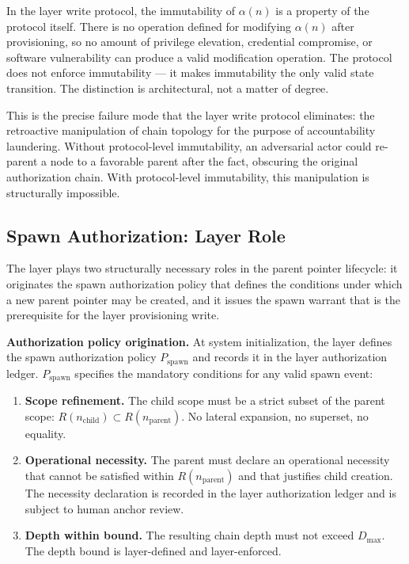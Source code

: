 In the \fact{} layer write protocol, the immutability of $\alpha(n)$ is a property of the protocol itself. There is no operation defined for modifying $\alpha(n)$ after provisioning, so no amount of privilege elevation, credential compromise, or software vulnerability can produce a valid modification operation. The protocol does not enforce immutability --- it makes immutability the only valid state transition. The distinction is architectural, not a matter of degree.

This is the precise failure mode that the \fact{} layer write protocol eliminates: the retroactive manipulation of chain topology for the purpose of accountability laundering. Without protocol-level immutability, an adversarial actor could re-parent a node to a favorable parent after the fact, obscuring the original authorization chain. With protocol-level immutability, this manipulation is structurally impossible.

\subsection{Spawn Authorization: \purpose{} Layer Role}
\label{sec:purpose-layer-spawn-authorization}

The \purpose{} layer plays two structurally necessary roles in the parent pointer lifecycle: it originates the spawn authorization policy that defines the conditions under which a new parent pointer may be created, and it issues the spawn warrant that is the prerequisite for the \fact{} layer provisioning write.

\medskip
\noindent\textbf{Authorization policy origination.} At system initialization, the \purpose{} layer defines the spawn authorization policy $P_{\mathrm{spawn}}$ and records it in the \fact{} layer authorization ledger. $P_{\mathrm{spawn}}$ specifies the mandatory conditions for any valid spawn event:

\begin{enumerate}
    \item[(S1)] \textbf{Scope refinement.} The child scope must be a strict subset of the parent scope: $R(n_{\mathrm{child}}) \subset R(n_{\mathrm{parent}})$. No lateral expansion, no superset, no equality.
    \item[(S2)] \textbf{Operational necessity.} The parent must declare an operational necessity that cannot be satisfied within $R(n_{\mathrm{parent}})$ and that justifies child creation. The necessity declaration is recorded in the \fact{} layer authorization ledger and is subject to human anchor review.
    \item[(S3)] \textbf{Depth within bound.} The resulting chain depth must not exceed $D_{\max}$. The depth bound is \purpose{} layer-defined and \fact{} layer-enforced.
\end{enumerate}

